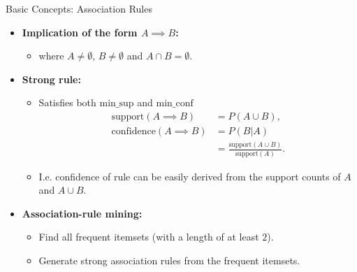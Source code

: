 \begin{frame}{Basic Concepts: Association Rules}
	\begin{itemize}
		\item \textbf{Implication of the form $A \implies B$:}
		      \begin{itemize}
			      \item where $A \neq \emptyset$, $B \neq \emptyset$ and $A \cap B =
				            \emptyset$.
		      \end{itemize}
		\item \textbf{Strong rule:}
		      \begin{itemize}
			      \item Satisfies both $\text{min\_sup}$ and $\text{min\_conf}$
			            \begin{align*}
				            \text{support}(A \implies B)    & = P(A \cup B),                                        \\
				            \text{confidence}(A \implies B) & = P(B | A)                                            \\
				                                            & = \frac{\text{support}(A \cup B)}{\text{support}(A)}.
			            \end{align*}
			      \item I.e. confidence of rule can be easily derived from the
			            support counts of $A$ and $A \cup B$.
		      \end{itemize}
		\item \textbf{Association-rule mining:}
		      \begin{itemize}
			      \item Find all frequent itemsets (with a length of at least $2$).
			      \item Generate strong association rules from the frequent itemsets.
		      \end{itemize}
	\end{itemize}
\end{frame}

